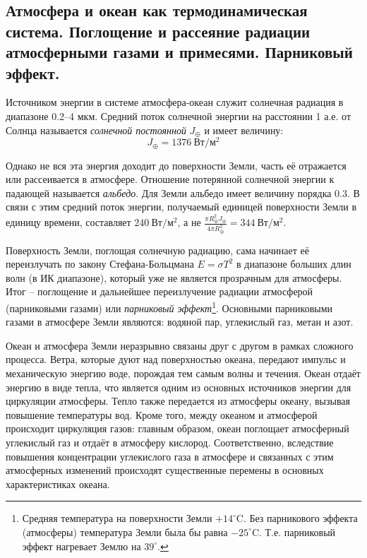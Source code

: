 \subsection{Атмосфера и океан как термодинамическая система. Поглощение и рассеяние радиации атмосферными газами и примесями. Парниковый эффект.}\label{q5-1}
Источником энергии в системе атмосфера-океан служит солнечная радиация в диапазоне 0.2--4 мкм.
Средний поток солнечной энергии на расстоянии 1 а.е. от Солнца называется \textit{солнечной постоянной} $J_\oplus$ и имеет величину:
\begin{equation}
J_\oplus=1376\:\text{Вт}/\text{м}^2
\end{equation}

Однако не вся эта энергия доходит до поверхности Земли, часть её отражается или рассеивается в атмосфере.
Отношение потерянной солнечной энергии к падающей называется \textit{альбедо}.
Для Земли альбедо имеет величину порядка 0.3.
В связи с этим средний поток энергии, получаемый единицей поверхности Земли в единицу времени, составляет $240\:\text{Вт}/\text{м}^2$, а не $\frac{\pi R_\oplus^2 J_\oplus}{4\pi R_\oplus^2}=344\:\text{Вт}/\text{м}^2$.

Поверхность Земли, поглощая солнечную радиацию, сама начинает её переизлучать по закону Стефана-Больцмана $E=\sigma T^2$ в диапазоне больших длин волн (в ИК диапазоне), который уже не является прозрачным для атмосферы.
Итог -- поглощение и дальнейшее переизлучение радиации атмосферой (парниковыми газами) или \textit{парниковый эффект}\footnote{Средняя температура на поверхности Земли $+14^\circ$C. Без парникового эффекта (атмосферы) температура Земли была бы равна $-25^\circ$C. Т.е. парниковый эффект нагревает Землю на $39^\circ$.}.
Основными парниковыми газами в атмосфере Земли являются: водяной пар, углекислый газ, метан и азот.

Океан и атмосфера Земли неразрывно связаны друг с другом в рамках сложного процесса.
Ветра, которые дуют над поверхностью океана, передают импульс и механическую энергию воде, порождая тем самым волны и течения.
Океан отдаёт энергию в виде тепла, что является одним из основных источников энергии для циркуляции атмосферы.
Тепло также передается из атмосферы океану, вызывая повышение температуры вод.
Кроме того, между океаном и атмосферой происходит циркуляция газов: главным образом, океан поглощает атмосферный углекислый газ и отдаёт в атмосферу кислород.
Соответственно, вследствие повышения концентрации углекислого газа в атмосфере и связанных с этим атмосферных изменений происходят существенные перемены в основных характеристиках океана.
